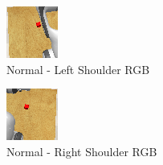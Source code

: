 \begin{figure}[htpb] %
  \centering
  \begin{subfigure}{0.40\linewidth}
    \centering
    \includegraphics[width=0.7\linewidth]{assets/depth-interfacing/normal-l_rgb.png}
    \caption{Normal - Left Shoulder RGB}\label{subfig:normal-l-shoulder}
  \end{subfigure}
  \begin{subfigure}{0.40\linewidth}
    \centering
    \includegraphics[width=0.7\linewidth]{assets/depth-interfacing/normal-r_rgb.png}
    \caption{Normal - Right Shoulder RGB}\label{subfig:normal-r-shoulder}
  \end{subfigure}
  \begin{subfigure}{0.40\linewidth}
    \centering

\end{subfigure}
\end{figure}
